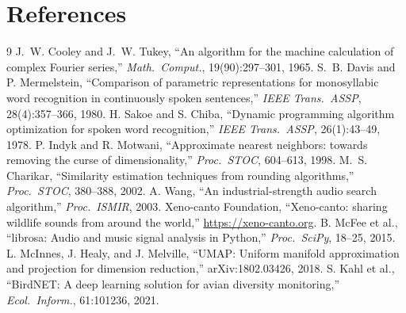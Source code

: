 \documentclass[10pt]{article}
\begin{document}
\section*{References}
\begingroup\footnotesize
\setlength{\parskip}{1pt}
\renewcommand{\section}[2]{}
\begin{thebibliography}{9}\setlength{\itemsep}{0pt}
 J.~W. Cooley and J.~W. Tukey, ``An algorithm for the machine calculation of complex Fourier series,'' \emph{Math.\ Comput.}, 19(90):297--301, 1965.
 S.~B. Davis and P. Mermelstein, ``Comparison of parametric representations for monosyllabic word recognition in continuously spoken sentences,'' \emph{IEEE Trans.\ ASSP}, 28(4):357--366, 1980.
 H. Sakoe and S. Chiba, ``Dynamic programming algorithm optimization for spoken word recognition,'' \emph{IEEE Trans.\ ASSP}, 26(1):43--49, 1978.
 P. Indyk and R. Motwani, ``Approximate nearest neighbors: towards removing the curse of dimensionality,'' \emph{Proc.\ STOC}, 604--613, 1998.
 M.~S. Charikar, ``Similarity estimation techniques from rounding algorithms,'' \emph{Proc.\ STOC}, 380--388, 2002.
 A. Wang, ``An industrial-strength audio search algorithm,'' \emph{Proc.\ ISMIR}, 2003.
 Xeno-canto Foundation, ``Xeno-canto: sharing wildlife sounds from around the world,'' \url{https://xeno-canto.org}.
 B. McFee et al., ``librosa: Audio and music signal analysis in Python,'' \emph{Proc.\ SciPy}, 18--25, 2015.
 L. McInnes, J. Healy, and J. Melville, ``UMAP: Uniform manifold approximation and projection for dimension reduction,'' arXiv:1802.03426, 2018.
 S. Kahl et al., ``BirdNET: A deep learning solution for avian diversity monitoring,'' \emph{Ecol.\ Inform.}, 61:101236, 2021.
\end{thebibliography}
\endgroup
\end{document}
